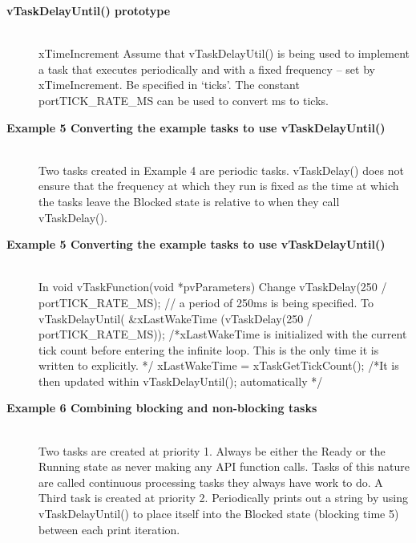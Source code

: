 \begin{description}
\os{\newpage}



\item[{\rot\bf vTaskDelayUntil() prototype}]~\\[-3ex]
\bi
\ite xTimeIncrement
\bi
\ite Assume that vTaskDelayUtil() is being used to implement a task that executes periodically and with a fixed frequency – set by xTimeIncrement.
\ite Be specified in ‘ticks’. The constant portTICK_RATE_MS can be used to convert ms to ticks.
\ei
\ei

\os{\newpage}



\item[{\rot\bf Example 5 Converting the example tasks to use vTaskDelayUntil()}]~\\[-3ex]
\bi
\ite Two tasks created in Example 4 are periodic tasks.
\ite vTaskDelay() does not ensure that the frequency at which they run is fixed
\bi
\ite as the time at which the tasks leave the Blocked state is relative to when they call vTaskDelay().
\ei
\ei

\os{\newpage}



\item[{\rot\bf Example 5 Converting the example tasks to use vTaskDelayUntil()}]~\\[-3ex]
\bi
\ite In void vTaskFunction(void *pvParameters)
\bi
\ite Change
\ite vTaskDelay(250 / portTICK_RATE_MS);
\ite // a period of 250ms is being specified.
\ite To
\ite vTaskDelayUntil( \&xLastWakeTime (vTaskDelay(250 / portTICK_RATE_MS));
\ite /*xLastWakeTime is initialized with the current tick count before entering the infinite loop. This is the only time it is written to explicitly. */
\ite xLastWakeTime = xTaskGetTickCount();
\ite /*It is then updated within vTaskDelayUntil(); automatically */
\ei
\ei

\os{\newpage}



\item[{\rot\bf Example 6 Combining blocking and non-blocking tasks}]~\\[-3ex]
\bi
\ite Two tasks are created at priority 1.
\bi
\ite Always be either the Ready or the Running state as never making any API function calls.
\ite Tasks of this nature are called continuous processing tasks they always have work to do.
\ei
\ite A Third task is created at priority 2.
\bi
\ite Periodically prints out a string by using vTaskDelayUntil() to place itself into the Blocked state (blocking time 5) between each print iteration.
\ite
\ei
\ei


\end{description}

